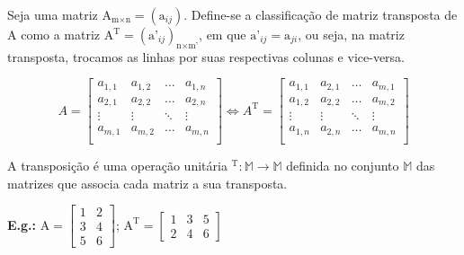 \documentclass[a4paper,12pt]{article}
\begin{document}
Seja uma matriz $ \text{A}_{\text{m} \times \text{n}} = (\text{a}_{ij})$.
Define-se a classificação de matriz transposta de $ \text{A} $ como a matriz $ \text{A}^{\text{T}} =(\text{a'}_{ij})_{\text{n} \times \text{m'}} $, em que $ \text{a'}_{ij} = \text{a}_{ji} $, ou seja, na matriz transposta, trocamos as linhas por suas respectivas colunas e vice-versa.

$$
A = \begin{bmatrix}
a_{1,1} & a_{1,2} & \ldots & a_{1,n} \\
a_{2,1} & a_{2,2} & \ldots & a_{2,n} \\
\vdots  & \vdots  & \ddots & \vdots \\
a_{m,1} & a_{m,2} & \ldots & a_{m,n} \\
\end{bmatrix} \Leftrightarrow
A^\text{T} = \begin{bmatrix}
a_{1,1} & a_{2,1} & \ldots & a_{m,1} \\
a_{1,2} & a_{2,2} & \ldots & a_{m,2} \\
\vdots  & \vdots  & \ddots & \vdots \\
a_{1,n} & a_{2,n} & \ldots & a_{m,n} \\
\end{bmatrix}$$

A transposição é uma operação unitária ${}^\text{T}:\mathbb{M}\to\mathbb{M} $ definida no conjunto $ \mathbb{M} $ das matrizes que associa cada matriz a sua transposta.

\textbf{E.g.:} $ \text{A} = \begin{bmatrix}
1 & 2 \\
3 & 4 \\
5 & 6
\end{bmatrix} $; $\text{A}^{\text{T}} = \begin{bmatrix}
1 & 3 & 5 \\
2 & 4 & 6
\end{bmatrix}$
\end{document}
